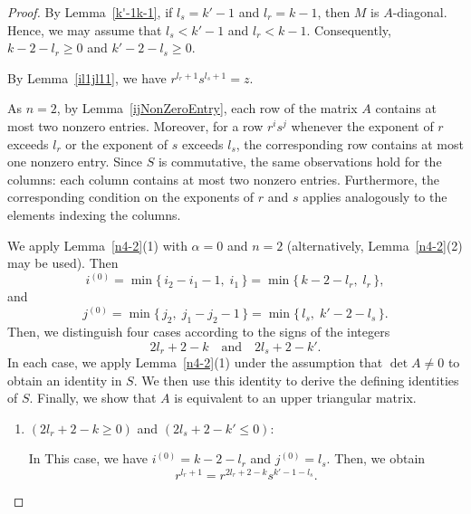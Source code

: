\documentclass[11pt,reqno]{amsart}
\theoremstyle{plain}
\theoremstyle{remark}
\theoremstyle{definition}
\begin{document}
\begin{proof}
By Lemma~\ref{k'-1k-1}, if $l_s=k'-1$ and $l_r=k-1$, then $M$ is $A$-diagonal. Hence, we may assume that $l_s<k'-1$ and $l_r<k-1$. Consequently,
\(k-2-l_r\geq0\) and \(k'-2-l_s\geq0\).

By Lemma~\ref{il1jl11}, we have $r^{l_r+1}s^{l_s+1} = z$.

As $n=2$, by Lemma~\ref{ijNonZeroEntry}, each row of the matrix $A$ contains at most two nonzero entries. Moreover, for a row $r^is^j$ whenever the exponent of $r$ exceeds $l_r$ or the exponent of $s$ exceeds $l_s$, the corresponding row contains at most one nonzero entry. Since $S$ is commutative, the same observations hold for the columns: each column contains at most two nonzero entries. Furthermore, the corresponding condition on the exponents of $r$ and $s$ applies analogously to the elements indexing the columns.

We apply Lemma~\ref{n4-2}(1) with $\alpha=0$ and $n=2$ (alternatively, Lemma~\ref{n4-2}(2) may be used). Then
\[i^{(0)}=\min\{\,i_2-i_1-1,\; i_1\,\}=\min\{\,k-2-l_r,\; l_r\,\},\]
and
\[j^{(0)}=\min\{\,j_2,\; j_1-j_2-1\,\}=\min\{\,l_s,\; k'-2-l_s\,\}.\]
Then, we distinguish four cases according to the signs of the integers
\[
2l_r+2-k
\quad\text{and}\quad
2l_s+2-k'.
\]
In each case, we apply Lemma~\ref{n4-2}(1) under the assumption that $\det A\neq0$ to obtain an identity in $S$. We then use this identity to derive the defining identities of $S$. Finally, we show that $A$ is equivalent to an upper triangular matrix.
\begin{enumerate}
\item[(i)] $(2l_r+2-k\geq 0)$ and $(2l_s+2-k'\leq 0)$:

In This case, we have $i^{(0)}=k-2-l_r$ and $j^{(0)}= l_s$.
Then, we obtain
\begin{equation}\label{eq1-1}
r^{l_r+1} = r^{2l_r+2-k}s^{k'-1-l_s}.
\end{equation}


\end{enumerate}
\end{proof}
\end{document}
